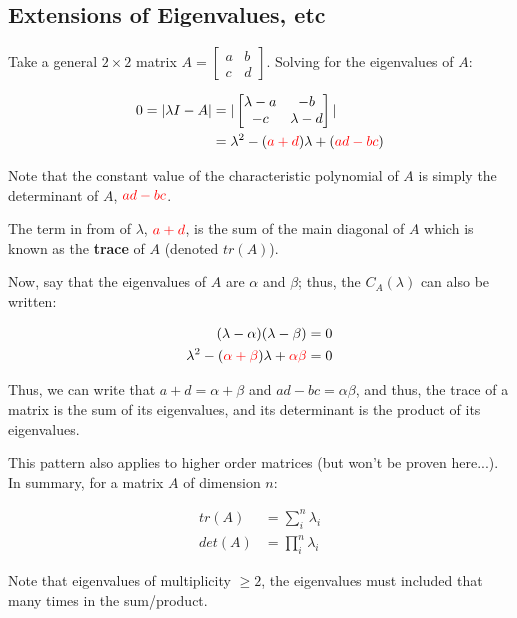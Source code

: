 \documentclass[12pt]{article}
\begin{document}
{{\subsection{Extensions of Eigenvalues, etc}

Take a general $2 \times 2$ matrix $A = \begin{bmatrix}
    a & b\\
    c & d
\end{bmatrix}$. Solving for the eigenvalues of $A$:

\begin{align*}
    0 = |\lambda I - A| &= |\begin{bmatrix}
        \lambda - a & -b\\
        -c & \lambda - d
    \end{bmatrix}|\\
    &= \lambda^2 - (\textcolor{red}{a+d})\lambda + (\textcolor{red}{ad - bc})\\
\end{align*}

Note that the constant value of the characteristic polynomial of $A$ is simply the determinant of $A$, $\textcolor{red}{ad - bc}$.

The term in from of $\lambda$, $\textcolor{red}{a+d}$, is the sum of the main diagonal of $A$ which is known as the \textbf{trace} of $A$ (denoted $tr(A)$). 

Now, say that the eigenvalues of $A$ are $\alpha$ and $\beta$; thus, the $C_A(\lambda)$ can also be written:

\begin{align*}
    (\lambda - \alpha)(\lambda - \beta) &= 0\\
    \lambda^2 - (\textcolor{red}{\alpha + \beta})\lambda + \textcolor{red}{\alpha\beta} &= 0
\end{align*}
    
Thus, we can write that $a+d = \alpha + \beta$ and $ad - bc = \alpha\beta$, and thus, the trace of a matrix is the sum of its eigenvalues, and its determinant is the product of its eigenvalues. 

This pattern also applies to higher order matrices (but won't be proven here...). In summary, for a matrix $A$ of dimension $n$:

\begin{align*}
    tr(A) &= \sum_i^n \lambda_i \\
    det(A) &= \prod_i^n \lambda_i
\end{align*}

Note that eigenvalues of multiplicity $\geq 2$, the eigenvalues must included that many times in the sum/product.

}}
\end{document}
